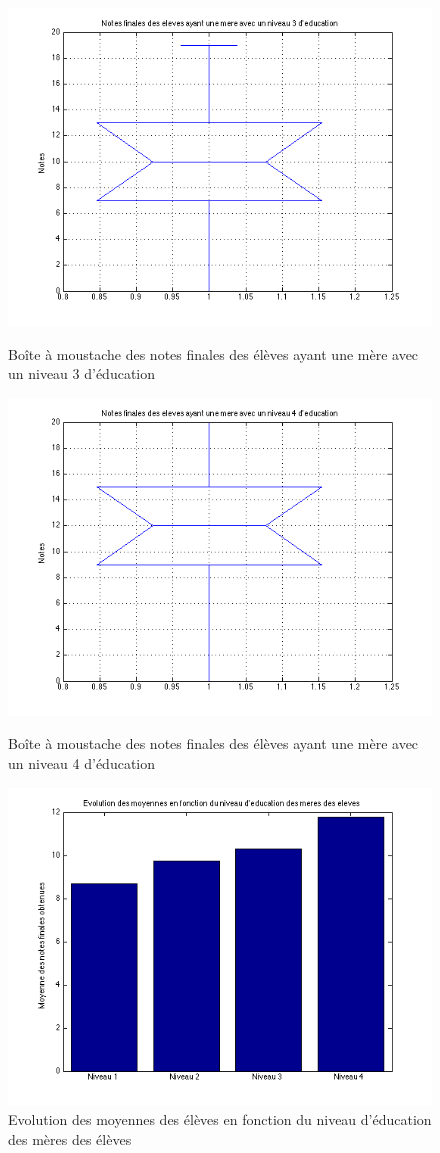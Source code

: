 \documentclass[11pt]{article}
\begin{document}
\begin{figure}[h]
\centering
\includegraphics[scale=0.45]{Images/fig32.png}
\caption{Boîte à moustache des notes finales des élèves ayant une mère avec un niveau 3 d'éducation}
\includegraphics[scale=0.45]{Images/fig33.png}
\caption{Boîte à moustache des notes finales des élèves ayant une mère avec un niveau 4 d'éducation}
\includegraphics[scale=0.45]{Images/fig34.png}
\caption{Evolution des moyennes des élèves en fonction du niveau d'éducation des mères des élèves}
\end{figure}
\end{document}

